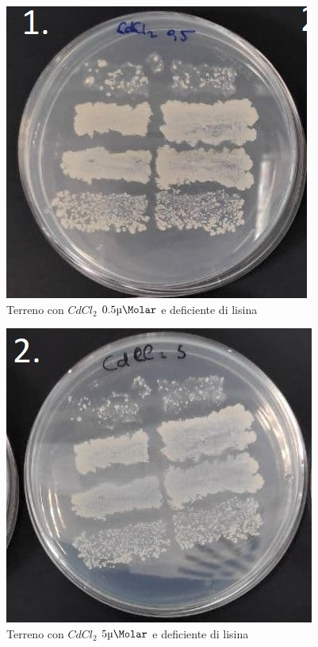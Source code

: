 \begin{multicols}{3}
	
	\begin{figure}[H]
		\centering
		\includegraphics[scale=0.4]{./Pics/GeniAmbiente/CdCl05.jpg}
		\caption{Terreno con \emph{$CdCl_2$} $0.5\si{\micro\Molar}$ e deficiente di lisina}
		\label{fig2}
	\end{figure}

	\begin{figure}[H]
		\centering
		\includegraphics[scale=0.4]{./Pics/GeniAmbiente/CdCl5.jpg}
		\caption{Terreno con \emph{$CdCl_2$} $5\si{\micro\Molar}$ e deficiente di lisina}
		\label{fig3}
	\end{figure}


\end{multicols}
